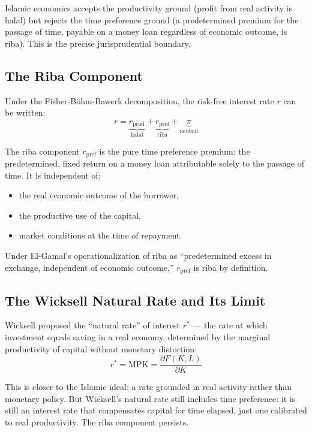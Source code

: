 \documentclass[10pt,twocolumn]{article}
\theoremstyle{plain}
\theoremstyle{definition}
\begin{document}
Islamic economics accepts the productivity ground (profit from
real activity is halal) but rejects the time preference ground
(a predetermined premium for the passage of time, payable on
a money loan regardless of economic outcome, is riba). This
is the precise jurisprudential boundary.

\subsection{The Riba Component}

Under the Fisher-Böhm-Bawerk decomposition, the risk-free
interest rate $r$ can be written:
\begin{equation}
r = \underbrace{r_{\text{prod}}}_{\text{halal}} +
\underbrace{r_{\text{pref}}}_{\text{riba}} +
\underbrace{\pi}_{\text{neutral}}
\label{eq:riba_decomp}
\end{equation}

The riba component $r_{\text{pref}}$ is the pure time preference
premium: the predetermined, fixed return on a money loan
attributable solely to the passage of time. It is independent of:
\begin{itemize}[leftmargin=*,noitemsep]
\item the real economic outcome of the borrower,
\item the productive use of the capital,
\item market conditions at the time of repayment.
\end{itemize}

Under El-Gamal's \cite{ElGamal2006} operationalization of riba
as ``predetermined excess in exchange, independent of economic
outcome,'' $r_{\text{pref}}$ is riba by definition.

\subsection{The Wicksell Natural Rate and Its Limit}

Wicksell \cite{Wicksell1898} proposed the ``natural rate'' of
interest $r^*$ --- the rate at which investment equals saving
in a real economy, determined by the marginal productivity of
capital without monetary distortion:
\begin{equation}
r^* = \text{MPK} = \frac{\partial F(K,L)}{\partial K}
\label{eq:wicksell}
\end{equation}

This is closer to the Islamic ideal: a rate grounded in real
activity rather than monetary policy. But Wicksell's natural
rate still includes time preference: it is still an interest
rate that compensates capital for time elapsed, just one
calibrated to real productivity. The riba component persists.
\end{document}
